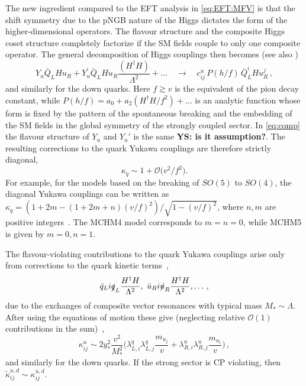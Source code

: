 \documentclass[../report.tex]{subfiles}
\begin{document}
The new ingredient compared to the EFT analysis in \eqref{eq:EFT:MFV}
is that the shift symmetry due to the pNGB nature of the Higgs
dictates the form of the higher-dimensional operators. The flavour
structure and the composite Higgs coset structure completely factorize
if the SM fields couple to only one composite operator. The general
decomposition of Higgs couplings then becomes \cite{Agashe:2009di}
(see also \cite{Gillioz:2012se,Delaunay:2013iia,Azatov:2014lha})
\begin{equation}\label{eq:comp}
	Y_u \bar{Q}_L H u_R + Y_u^\prime\bar{Q}_L H u_R
        \frac{(H^\dagger H)}{\Lambda^2}+\ldots \quad \to \quad
        c_{ij}^u \, P(h/f) \, \bar{Q}_L^i H u_R^j \,,
\end{equation}
and similarly for the down quarks. Here $f\gtrsim v$ is the equivalent
of the pion decay constant, while $P(h/f)=a_0+a_2 (H^\dagger H/f^2)+\ldots
$ is an analytic function whose form is fixed by the  pattern of the
spontaneous breaking and the embedding of the SM fields in the global
symmetry of the strongly coupled sector. In \eqref{eq:comp} the flavour
structure of $Y_u$ and $Y_u'$ 
is the same {\bf YS: is it assumption?}. The resulting corrections to the quark Yukawa couplings 
are therefore strictly diagonal, 
\begin{equation}\label{eq:kappaq:estimate}
\kappa_q\sim 1+{\mathcal O}\big({v^2}/{f^2}\big).
\end{equation}
For example, for the models based on the breaking of $SO(5)$ to
$SO(4)$, the diagonal Yukawa couplings can be written
as
$\kappa_q=(1+2m-(1+2m+n)(v/f)^2)/{\sqrt{1-(v/f)^2}}$,
where $n,m$ are positive integers~\cite{Pomarol:2012qf}. The MCHM4 model corresponds to
$m=n=0$, while MCHM5 is given by $m=0,n=1$.

The flavour-violating contributions to the quark Yukawa couplings
arise only from corrections to the quark kinetic terms~\cite{Agashe:2009di},
\begin{equation}
\bar q_L i \slashed q_L \frac{H^\dagger H}{\Lambda^2}, \,\,
\bar u_R i \slashed u_R \frac{H^\dagger H}{\Lambda^2},
\dots\,,
\end{equation}
due to the exchanges of composite vector resonances
with typical mass $M_* \sim \Lambda$. After using the equations of
motion 
these give (neglecting relative ${\mathcal O}(1)$ contributions
in the sum)~\cite{Agashe:2009di, Azatov:2014lha, Delaunay:2013pja},
\begin{equation}
\kappa_{ij}^u\sim 2 y_*^2 \frac{v^2}{M_*^2}
\Big(\lambda_{L,i}^q\lambda_{L,j}^q \frac{m_{u_j}}{v}
+\lambda_{R,i}^u\lambda_{R,j}^u \frac{m_{u_i}}{v}\Big)\,,
\end{equation}
and similarly for the down quarks. If the strong sector is CP
violating, then $\tilde \kappa_{ij}^{u,d}\sim \kappa_{ij}^{u,d}$.
\end{document}
